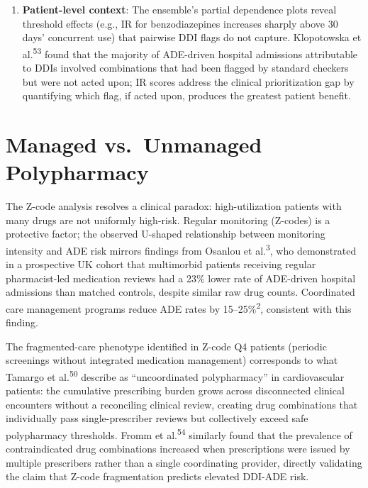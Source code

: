 \documentclass[
  12pt,
]{book}
\begin{document}
\begin{enumerate}
  reduction, enabling pharmacists to target the highest-yield
  modifications. Unlike Beers Criteria (which lists drugs to avoid
  without quantifying expected benefit)\textsuperscript{52} or
  STOPP/START (which provides binary prescribing flags), IR scores
  provide a continuous, cohort-specific estimate of the expected risk
  reduction from a specific deprescribing action. The Pirmohamed 2023
  PREPARE trial\textsuperscript{51} demonstrated that
  pharmacogenomically guided deprescribing with a 12-gene panel reduced
  ADEs by 30\% in a European RCT; the IR score approach extends this
  concept to the population-level claims setting, without requiring
  prospective genotyping.
\item
  \textbf{Patient-level context}: The ensemble's partial dependence
  plots reveal threshold effects (e.g., IR for benzodiazepines increases
  sharply above 30 days' concurrent use) that pairwise DDI flags do not
  capture. Klopotowska et al.\textsuperscript{53} found that the
  majority of ADE-driven hospital admissions attributable to DDIs
  involved combinations that had been flagged by standard checkers but
  were not acted upon; IR scores address the clinical prioritization gap
  by quantifying which flag, if acted upon, produces the greatest
  patient benefit.
\end{enumerate}

\section{Managed vs.~Unmanaged
Polypharmacy}\label{managed-vs.-unmanaged-polypharmacy}

The Z-code analysis resolves a clinical paradox: high-utilization
patients with many drugs are not uniformly high-risk. Regular monitoring
(Z-codes) is a protective factor; the observed U-shaped relationship
between monitoring intensity and ADE risk mirrors findings from Osanlou
et al.\textsuperscript{3}, who demonstrated in a prospective UK cohort
that multimorbid patients receiving regular pharmacist-led medication
reviews had a 23\% lower rate of ADE-driven hospital admissions than
matched controls, despite similar raw drug counts. Coordinated care
management programs reduce ADE rates by 15--25\%\textsuperscript{2},
consistent with this finding.

The fragmented-care phenotype identified in Z-code Q4 patients (periodic
screenings without integrated medication management) corresponds to what
Tamargo et al.\textsuperscript{50} describe as ``uncoordinated
polypharmacy'' in cardiovascular patients: the cumulative prescribing
burden grows across disconnected clinical encounters without a
reconciling clinical review, creating drug combinations that
individually pass single-prescriber reviews but collectively exceed safe
polypharmacy thresholds. Fromm et al.\textsuperscript{54} similarly
found that the prevalence of contraindicated drug combinations increased
when prescriptions were issued by multiple prescribers rather than a
single coordinating provider, directly validating the claim that Z-code
fragmentation predicts elevated DDI-ADE risk.
\end{document}
